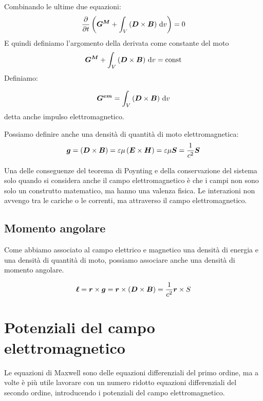Combinando le ultime due equazioni:
\begin{equation}
  \frac{\partial}{\partial t}\left(\boldsymbol{G^M}+\int_V\left(\boldsymbol{D}\times\boldsymbol{B}\right)\,\mathrm{d} v \right)=0
\end{equation}
E quindi definiamo l'argomento della derivata come constante del moto
\begin{equation}
  \boldsymbol{G^M}+\int_V\left(\boldsymbol{D}\times\boldsymbol{B}\right)\,\mathrm{d} v=\boldsymbol{\text{const}}
\end{equation}
Definiamo:
\begin{Def}
  \begin{equation}
    \boldsymbol{G^{em}}=\int_V\left(\boldsymbol{D}\times\boldsymbol{B}\right)\,\mathrm{d} v
  \end{equation}
  detta anche impulso elettromagnetico.
\end{Def}
Possiamo definire anche una densità di quantità di moto elettromagnetica:
\begin{equation}
  \boldsymbol{g}=\left(\boldsymbol{D}\times\boldsymbol{B}\right)=\varepsilon\mu\left(\boldsymbol{E}\times\boldsymbol{H}\right)=\varepsilon\mu\boldsymbol{S}=\frac{1}{c^2}\boldsymbol{S}
\end{equation}

Una delle conseguenze del teorema di Poynting e della conservazione del sistema solo quando si considera anche il campo elettromagnetico è che i campi non sono solo un construtto matematico, ma hanno una valenza fisica. Le interazioni non avvengo tra le cariche o le correnti, ma attraverso il campo elettromagnetico.

\subsection{Momento angolare}
Come abbiamo associato al campo elettrico e magnetico una densità di energia e una densità di quantità di moto, possiamo associare anche una densità di momento angolare.

\begin{equation}
  \boldsymbol{\ell} = \boldsymbol{r} \times \boldsymbol{g} = \boldsymbol{r} \times \left(\boldsymbol{D} \times \boldsymbol{B}\right) = \frac{1}{c^2}\boldsymbol{r} \times S
\end{equation}

\section{Potenziali del campo elettromagnetico}
Le equazioni di Maxwell sono delle equazioni differenziali del primo ordine, ma a volte è più utile lavorare con un numero ridotto equazioni differenziali del secondo ordine, introducendo i potenziali del campo elettromagnetico.

